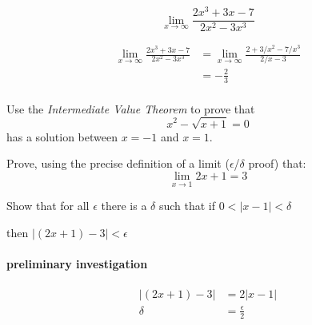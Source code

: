 \documentclass[letterpaper, landscape]{exam}
\begin{document}
\begin{questions}


    \question[8] 
    \label{q:last_limit}
      \[
        \lim_{x \to \infty} \frac{2x^3 + 3x - 7}{2x^2 - 3x^3}
      \]

      \begin{solution}
        \begin{align*}
          \lim_{x \to \infty} \frac{2x^3 + 3x - 7}{2x^2 - 3x^3} & = \lim_{x \to \infty} \frac{2 + 3/x^2 - 7/x^3}{2/x - 3} \\
                                                                & = \boxed{ - \frac{2}{3} } \\
        \end{align*}
      \end{solution}

    \question[5] Use the {\em Intermediate Value Theorem} to prove that 
      \[
        x^2 - \sqrt{x + 1} = 0
      \]
      has a solution between $x = -1$ and $x = 1$.

    \question[10]
      Prove, using the precise definition of a limit ($\epsilon$/$\delta$ proof) that:
      \[
        \lim_{x \to 1} 2x + 1 = 3
      \]

      \begin{solution}
        Show that for all $\epsilon$ there is a $\delta$ such that if 
        $0 < |x - 1| < \delta$ 
        
        then $|(2x + 1) - 3| < \epsilon$

        \paragraph{preliminary investigation}
        \begin{align*}
          |(2x + 1) - 3| & = 2|x - 1| \\
          \delta         & = \frac{\epsilon}{2} \\
        \end{align*}


\end{solution}
\end{questions}
\end{document}
